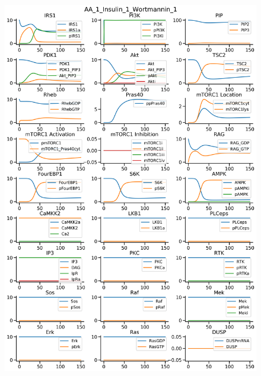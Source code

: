 \documentclass{beamer}
\begin{document}
\begin{frame}
\begin{figure}
\begin{minipage}{0.45\textwidth}
        \centering
        \includegraphics[width=\textwidth]{../simulations/ExtendedPI3KModel/validations/AAWithInsulinWithWortmannin/AA_1_Insulin_1_Wortmannin_1-7.png}
    \end{minipage}
\end{figure}
\end{frame}


\end{document}

